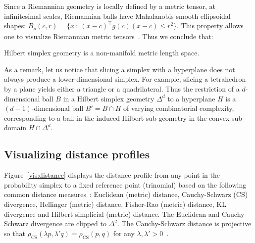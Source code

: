 \documentclass[graybox]{svmult}
\def\CS{\mathrm{CS}}
\begin{document}
Since a Riemannian geometry is locally defined by a metric tensor,
at infinitesimal scales, Riemannian balls have Mahalanobis smooth ellipsoidal shapes:
$B_\rho(c,r)=\{x\ :\ (x-c)^\top g(c) (x-c)\leq r^2\}$.
This property allows one to visualize Riemannian metric tensors~\cite{VizTensor-2009}. Thus we conclude that:
\begin{lemma}[\cite{BH-2014}]
Hilbert simplex geometry is a non-manifold metric length space.
\end{lemma}

As a remark, let us notice that slicing a simplex with a hyperplane does not always produce a lower-dimensional simplex.
For example, slicing a tetrahedron by a plane yields either a triangle or a quadrilateral.
Thus the restriction of a $d$-dimensional ball $B$ in a Hilbert simplex geometry $\Delta^d$ to a hyperplane $H$ is a $(d-1)$-dimensional ball $B'=B\cap H$  of varying combinatorial complexity, corresponding to a ball in the induced Hilbert sub-geometry in the convex sub-domain $H\cap\Delta^d$.


\subsection{Visualizing distance profiles}

Figure~\ref{vis:distance} displays the distance profile from any point in the probability simplex 
to a fixed reference point (trinomial) based on the following common distance measures~\cite{IG-2014}:
Euclidean (metric) distance, Cauchy-Schwarz (CS) divergence,
Hellinger (metric) distance, Fisher-Rao (metric) distance,
KL divergence and Hilbert simplicial (metric) distance.
The Euclidean and Cauchy-Schwarz divergence are clipped to $\Delta^2$. 
The Cauchy-Schwarz distance is projective so that
$\rho_\CS(\lambda p,\lambda' q)=\rho_\CS(p,q)$ for any $\lambda,\lambda'>0$~\cite{holder}.
\end{document}

